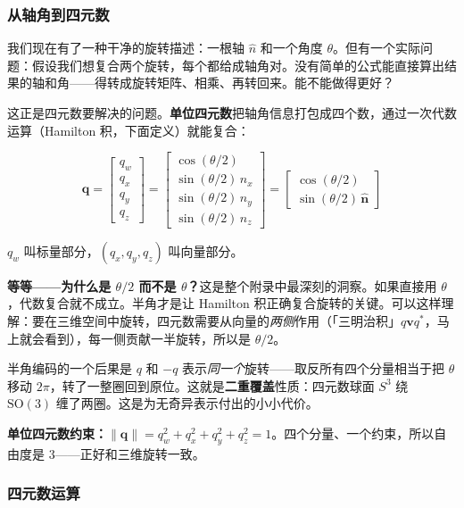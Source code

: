 \subsubsection{从轴角到四元数}

我们现在有了一种干净的旋转描述：一根轴 $\hat{n}$ 和一个角度 $\theta$。但有一个实际问题：假设我们想复合两个旋转，每个都给成轴角对。没有简单的公式能直接算出结果的轴和角——得转成旋转矩阵、相乘、再转回来。能不能做得更好？

这正是四元数要解决的问题。\textbf{单位四元数}把轴角信息打包成四个数，通过一次代数运算（Hamilton 积，下面定义）就能复合：

\begin{equation}
\mathbf{q} = \begin{bmatrix} q_w \\ q_x \\ q_y \\ q_z \end{bmatrix} = \begin{bmatrix} \cos(\theta/2) \\ \sin(\theta/2)\,n_x \\ \sin(\theta/2)\,n_y \\ \sin(\theta/2)\,n_z \end{bmatrix} = \begin{bmatrix} \cos(\theta/2) \\ \sin(\theta/2)\,\hat{\mathbf{n}} \end{bmatrix}
\end{equation}

$q_w$ 叫标量部分，$(q_x, q_y, q_z)$ 叫向量部分。

\textbf{等等——为什么是 $\theta/2$ 而不是 $\theta$？}这是整个附录中最深刻的洞察。如果直接用 $\theta$，代数复合就不成立。半角才是让 Hamilton 积正确复合旋转的关键。可以这样理解：要在三维空间中旋转，四元数需要从向量的\textit{两侧}作用（「三明治积」$q \mathbf{v} q^*$，马上就会看到），每一侧贡献一半旋转，所以是 $\theta/2$。

半角编码的一个后果是 $q$ 和 $-q$ 表示\textit{同一个}旋转——取反所有四个分量相当于把 $\theta$ 移动 $2\pi$，转了一整圈回到原位。这就是\textbf{二重覆盖}性质：四元数球面 $S^3$ 绕 $\mathrm{SO}(3)$ 缠了两圈。这是为无奇异表示付出的小小代价。

\textbf{单位四元数约束：}$\|\mathbf{q}\| = q_w^2 + q_x^2 + q_y^2 + q_z^2 = 1$。四个分量、一个约束，所以自由度是 3——正好和三维旋转一致。

\subsubsection{四元数运算}

